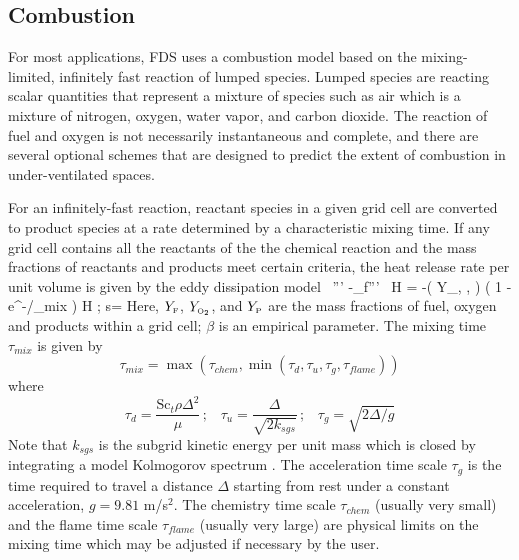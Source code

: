 \subsection{Combustion}

For most applications, FDS uses a combustion model based on the mixing-limited, infinitely fast reaction of lumped species.
Lumped species are reacting scalar quantities that represent a mixture of species such as air which is a mixture of
nitrogen, oxygen, water vapor, and carbon dioxide.  The reaction of fuel and oxygen is not necessarily instantaneous and
complete, and there are
several optional schemes that are designed to predict the extent of combustion in under-ventilated spaces.

For an infinitely-fast reaction, reactant species in a given grid cell are converted to product species at a rate determined by a
characteristic mixing time. If any grid cell contains all the reactants of the the chemical reaction and the mass fractions of reactants and products meet certain criteria, the heat release rate per unit volume is given by the eddy dissipation model~\cite{Poinsot:TNC}
\be
   \dq''' \equiv -\dm_f''' \, \Delta H = -\rho \min \left( Y_\F , , \beta {} \right) \;
   \left( 1 - e^{-\dt/\tau_{mix}} \right)  \; \Delta H \quad ; \quad
   s=  \label{EDC1}
\ee  %
Here, $Y_{\tiny \hbox{F}}$, $Y_{\tiny \hbox{O}_2}$, and $Y_{\hbox{\tiny P}}$ are the mass fractions of fuel, oxygen and products within a grid cell; $\beta$ is an empirical parameter.  The mixing time $\tau_{mix}$ is given by
\begin{equation}
\label{eqn_tau_mix}
\tau_{mix} = \max(\tau_{chem},\min(\tau_d,\tau_u,\tau_g,\tau_{flame}))
\end{equation}
where
\begin{equation}
\tau_{d}= \frac{\mbox{Sc}_t\rho\Delta^2}{\mu} \,\mbox{;}\quad
\tau_{u}= \frac{\Delta}{\sqrt{2k_{sgs}}} \,\mbox{;}\quad
\tau_{g}= \sqrt{ 2\Delta/g }
\end{equation}
Note that $k_{sgs}$ is the subgrid kinetic energy per unit mass which is closed by integrating a model Kolmogorov spectrum . The acceleration time scale $\tau_{g}$ is the time required to travel a distance $\Delta$ starting from rest under a constant acceleration, $g=9.81$ m/s$^2$.  The chemistry time scale $\tau_{chem}$ (usually very small) and the flame time scale $\tau_{flame}$ (usually very large) are physical limits on the mixing time which may be adjusted if necessary by the user.


